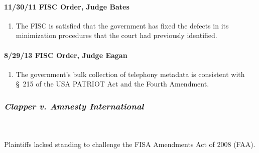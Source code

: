 \paragraph{11/30/11 FISC Order, Judge Bates}

\begin{enumerate}
    \item The FISC is satisfied that the government has fixed the defects in 
    its minimization procedures that the court had previously identified.
\end{enumerate}

\paragraph{8/29/13 FISC Order, Judge Eagan}

\begin{enumerate}
    \item The government's bulk collection of telephony metadata is consistent 
    with \S\ 215 of the USA PATRIOT Act and the Fourth Amendment.
\end{enumerate}

\subsubsection{\emph{Clapper v. Amnesty International}}
~\\\\
Plaintiffs lacked standing to challenge the FISA Amendments Act of 2008 (FAA).

